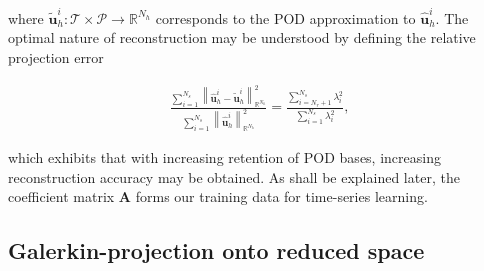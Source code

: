 \documentclass[preprint,12pt]{elsarticle}
\begin{document}
where $\tilde{\mathbf{u}}_h^i : \mathcal{T} \times \mathcal{P} \rightarrow \mathbb{R}^{N_h}$ corresponds to the POD approximation to $\hat{\mathbf{u}}_h^i$. The optimal nature of reconstruction may be understood by defining the relative projection error
\begin{linenomath*}
\begin{align}
\frac{\sum_{i=1}^{N_{s}}\left\|\hat{\mathbf{u}}^i_h-\tilde{\mathbf{u}}^i_h \right\|_{\mathbb{R}^{N_{h}}}^{2}}{\sum_{i=1}^{N_{s}}\left\|\hat{\mathbf{u}}^i_h\right\|_{\mathbb{R}^{N_{h}}}^{2}}=\frac{\sum_{i=N_r+1}^{N_{s}} \lambda_{i}^{2}}{\sum_{i=1}^{N_{s}} \lambda_{i}^{2}},
\end{align}
\end{linenomath*}
which exhibits that with increasing retention of POD bases, increasing reconstruction accuracy may be obtained. As shall be explained later, the coefficient matrix $\mathbf{A}$ forms our training data for time-series learning.

\subsection{Galerkin-projection onto reduced space}
\end{document}
